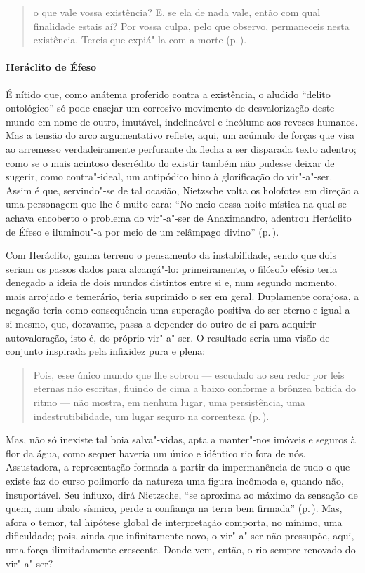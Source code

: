 \begin{quote} 
o que vale vossa existência? E, se ela de nada vale, então
 com qual finalidade estais aí? Por vossa culpa, pelo que observo,
 permaneceis nesta existência. Tereis que expiá"-la com a morte 
 (p.\,\pageref{oquevale}).
\end{quote} 

\paragraph{Heráclito de Éfeso} É nítido que, como anátema proferido contra a
 existência, o aludido ``delito ontológico'' só pode ensejar um corrosivo
 movimento de desvalorização deste mundo em nome de outro, imutável,
 indelineável e incólume aos reveses humanos. Mas a tensão do arco
 argumentativo reflete, aqui, um acúmulo de forças que visa ao arremesso
 verdadeiramente perfurante da flecha a ser disparada texto adentro; como se
 o mais acintoso descrédito do existir também não pudesse deixar de sugerir,
 como contra"-ideal, um antipódico hino à glorificação do vir"-a"-ser. Assim
 é que, servindo"-se de tal ocasião, Nietzsche volta os holofotes em direção
 a uma personagem que lhe é muito cara: ``No meio dessa noite mística na qual
 se achava encoberto o problema do vir"-a"-ser de Anaximandro, adentrou
 Heráclito de Éfeso e iluminou"-a por meio de um relâmpago divino''
 (p.\,\pageref{noitemistica}).

Com Heráclito, ganha terreno o pensamento da instabilidade, sendo que dois
seriam os passos dados para alcançá"-lo: primeiramente, o filósofo efésio
teria denegado a ideia de dois mundos distintos entre si e, num segundo
momento, mais arrojado e temerário, teria suprimido o ser em geral.
Duplamente corajosa, a negação teria como consequência uma superação positiva
do ser eterno e igual a si mesmo, que, doravante, passa a depender do outro
de si para adquirir autovaloração, isto é, do próprio vir"-a"-ser. O
resultado seria uma visão de conjunto inspirada pela infixidez pura e
plena: 

\begin{quote} 
Pois, esse único mundo que lhe sobrou --- escudado ao seu
 redor por leis eternas não escritas, fluindo de cima a baixo conforme a
 brônzea batida do ritmo --- não mostra, em nenhum lugar, uma persistência,
 uma indestrutibilidade, um lugar seguro na correnteza (p.\,\pageref{esseunicomundo}).
\end{quote} 

Mas, não só inexiste tal boia salva"-vidas, apta a manter"-nos imóveis e
seguros à flor da água, como sequer haveria um único e idêntico rio fora de
nós. Assustadora, a representação formada a partir da impermanência de tudo o
que existe faz do curso polimorfo da natureza uma figura incômoda e, quando
não, insuportável. Seu influxo, dirá Nietzsche, ``se aproxima ao máximo da
sensação de quem, num abalo sísmico, perde a confiança na terra bem
firmada'' (p.\,\pageref{abalosismico}). Mas, afora o temor, tal hipótese
global de interpretação comporta, no mínimo, uma dificuldade; pois, ainda que
infinitamente novo, o vir"-a"-ser não pressupõe, aqui, uma força
ilimitadamente crescente. Donde vem, então, o rio sempre renovado do
vir"-a"-ser? 

